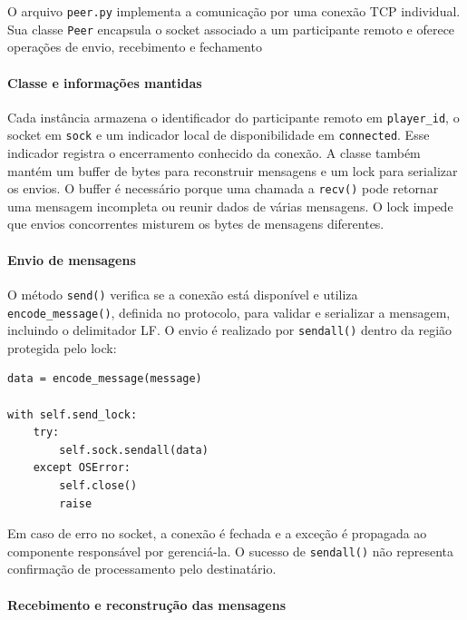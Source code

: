 \documentclass[11pt,a4paper]{article}
\begin{document}
O arquivo \texttt{peer.py} implementa a comunicação por uma conexão TCP individual. Sua classe \texttt{Peer} encapsula o socket associado a um participante remoto e oferece operações de envio, recebimento e fechamento

\paragraph{Classe e informações mantidas}

Cada instância armazena o identificador do participante remoto em \texttt{player\_id}, o socket em \texttt{sock} e um indicador local de disponibilidade em \texttt{connected}. Esse indicador registra o encerramento conhecido da conexão.
A classe também mantém um buffer de bytes para reconstruir mensagens e um lock para serializar os envios. O buffer é necessário porque uma chamada a \texttt{recv()} pode retornar uma mensagem incompleta ou reunir dados de várias mensagens. O lock impede que envios concorrentes misturem os bytes de mensagens diferentes.

\paragraph{Envio de mensagens}

O método \texttt{send()} verifica se a conexão está disponível e utiliza \texttt{encode\_message()}, definida no protocolo, para validar e serializar a mensagem, incluindo o delimitador LF. O envio é realizado por \texttt{sendall()} dentro da região protegida pelo lock:

\par\smallskip
\noindent
\begin{minipage}{\linewidth}
\begin{verbatim}
data = encode_message(message)

with self.send_lock:
    try:
        self.sock.sendall(data)
    except OSError:
        self.close()
        raise
\end{verbatim}
\end{minipage}
\par\smallskip

Em caso de erro no socket, a conexão é fechada e a exceção é propagada ao componente responsável por gerenciá-la. O sucesso de \texttt{sendall()} não representa confirmação de processamento pelo destinatário. 
\paragraph{Recebimento e reconstrução das mensagens}
\end{document}

